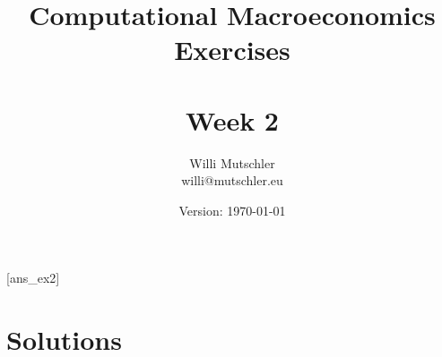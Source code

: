 
\newif\ifDisplaySolutions \DisplaySolutionstrue


\title{Computational Macroeconomics\\Exercises\\~\\Week 2}
\author{Willi Mutschler\\willi@mutschler.eu}
\date{Version: \today}
\maketitle\thispagestyle{empty}

\newpage
{}[ans_ex2]
\tableofcontents\thispagestyle{empty}\newpage

\setcounter{page}{1}
\newpage
\newpage
\newpage
\newpage


\printbibliography
{}
\ifDisplaySolutions
\newpage
\appendix
\section{Solutions}

\fi
